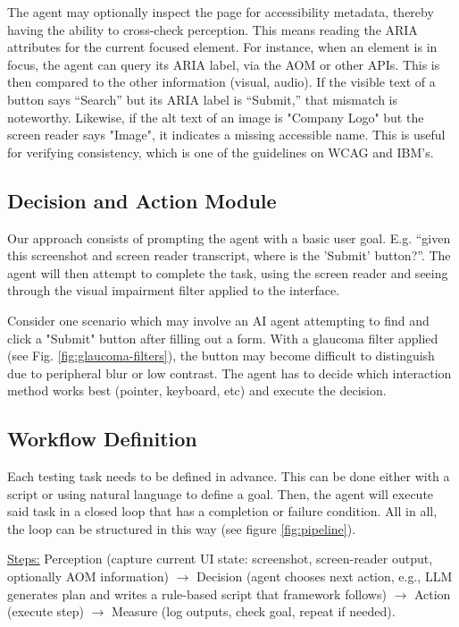 The agent may optionally inspect the page for accessibility metadata, thereby having the ability to cross-check perception. This means reading the ARIA attributes for the current focused element. For instance, when an element is in focus, the agent can query its ARIA label, via the \ac{AOM} or other APIs. This is then compared to the other information (visual, audio). If the visible text of a button says “Search” but its ARIA label is “Submit,” that mismatch is noteworthy. Likewise, if the alt text of an image is "Company Logo" but the screen reader says "Image", it indicates a missing accessible name. This is useful for verifying consistency, which is one of the guidelines on \ac{WCAG} and IBM's\cite{ibm2025accessibility}. 


\subsection{Decision and Action Module}

Our approach consists of prompting the agent with a basic user goal. E.g. “given this screenshot and screen reader transcript, where is the 'Submit' button?”. The agent will then attempt to complete the task, using the screen reader and seeing through the visual impairment filter applied to the interface.

Consider one scenario which may involve an \ac{AI} agent attempting to find and click a "Submit" button after filling out a form. With a glaucoma filter applied (see Fig. \ref{fig:glaucoma-filters}), the button may become difficult to distinguish due to peripheral blur or low contrast. The agent has to decide which interaction method works best (pointer, keyboard, etc) and execute the decision.

\subsection{Workflow Definition}

Each testing task needs to be defined in advance. This can be done either with a script or using natural language to define a goal. Then, the agent will execute said task in a closed loop that has a completion or failure condition. All in all, the loop can be structured in this way (see figure \ref{fig:pipeline}).

\underline{Steps:} Perception (capture current \ac{UI} state: screenshot, screen-reader output, optionally \ac{AOM} information) $\rightarrow$ Decision (agent chooses next action, e.g., LLM generates plan and writes a rule-based script that framework follows) $\rightarrow$ Action (execute step) $\rightarrow$ Measure (log outputs, check goal, repeat if needed).


